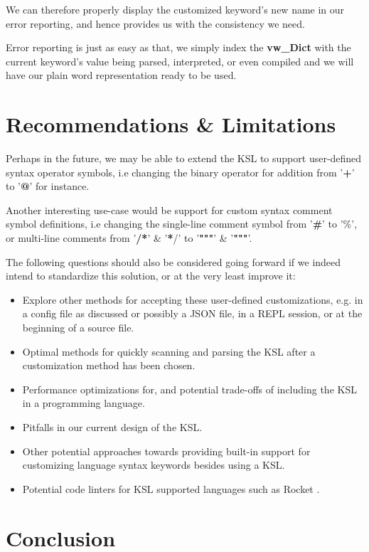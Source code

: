 \documentclass[a4paper,9pt]{article}
\begin{document}
We can therefore properly display the customized keyword's new name in our error reporting, and hence provides us with the consistency we need.

Error reporting is just as easy as that, we simply index the \textbf{vw\_Dict} with the current keyword's value being parsed, interpreted, or even compiled and we will have our plain word representation ready to be used.

\section{Recommendations \& Limitations}

Perhaps in the future, we may be able to extend the KSL to support user-defined syntax operator symbols, i.e changing the binary operator for addition from '\textbf{+}' to '\textbf{@}' for instance.
  
Another interesting use-case would be support for custom syntax comment symbol definitions, i.e changing the single-line comment symbol from '\textbf{\#}' to '\textbf{$\%$}', or multi-line comments from '\textbf{/*}' \& '\textbf{*}/' to '\textbf{"""}' \& '\textbf{"""}'.
  
The following questions should also be considered going forward if we indeed intend to standardize this solution, or at the very least improve it:
  
\begin{itemize}
    \item Explore other methods for accepting these user-defined customizations, e.g. in a config file as discussed or possibly a JSON file, in a REPL session, or at the beginning of a source file.
    \item Optimal methods for quickly scanning and parsing the KSL after a customization method has been chosen.
    \item Performance optimizations for, and potential trade-offs of including the KSL in a programming language.
    \item Pitfalls in our current design of the KSL.
    \item Other potential approaches towards providing built-in support for customizing language syntax keywords besides using a KSL.
    \item Potential code linters for KSL supported languages such as Rocket \cite{Rocket}.
\end{itemize}
  
\section{Conclusion}
  
\end{document}
